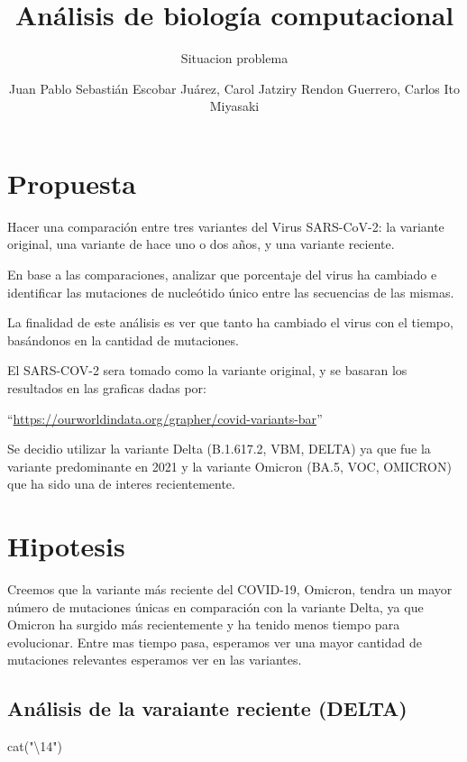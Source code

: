 \documentclass[
]{article}
\title{Análisis de biología computacional}
\subtitle{Situacion problema}
\author{Juan Pablo Sebastián Escobar Juárez, Carol Jatziry Rendon
Guerrero, Carlos Ito Miyasaki}
\date{}
\newenvironment{Shaded}{\begin{snugshade}}{\end{snugshade}}
\newcommand{\FunctionTok}[1]{\textcolor[rgb]{0.00,0.00,0.00}{#1}}
\newcommand{\NormalTok}[1]{#1}
\newcommand{\StringTok}[1]{\textcolor[rgb]{0.31,0.60,0.02}{#1}}
\begin{document}
\maketitle

\hypertarget{propuesta}{%
\section{Propuesta}\label{propuesta}}

Hacer una comparación entre tres variantes del Virus SARS-CoV-2: la
variante original, una variante de hace uno o dos años, y una variante
reciente.

En base a las comparaciones, analizar que porcentaje del virus ha
cambiado e identificar las mutaciones de nucleótido único entre las
secuencias de las mismas.

La finalidad de este análisis es ver que tanto ha cambiado el virus con
el tiempo, basándonos en la cantidad de mutaciones.

El SARS-COV-2 sera tomado como la variante original, y se basaran los
resultados en las graficas dadas por:

``\url{https://ourworldindata.org/grapher/covid-variants-bar}''

Se decidio utilizar la variante Delta (B.1.617.2, VBM, DELTA) ya que fue
la variante predominante en 2021 y la variante Omicron (BA.5, VOC,
OMICRON) que ha sido una de interes recientemente.

\hypertarget{hipotesis}{%
\section{Hipotesis}\label{hipotesis}}

Creemos que la variante más reciente del COVID-19, Omicron, tendra un
mayor número de mutaciones únicas en comparación con la variante Delta,
ya que Omicron ha surgido más recientemente y ha tenido menos tiempo
para evolucionar. Entre mas tiempo pasa, esperamos ver una mayor
cantidad de mutaciones relevantes esperamos ver en las variantes.

\hypertarget{anuxe1lisis-de-la-varaiante-reciente-delta}{%
\subsection{Análisis de la varaiante reciente
(DELTA)}\label{anuxe1lisis-de-la-varaiante-reciente-delta}}

\begin{Shaded}
\begin{Highlighting}[]
\FunctionTok{cat}\NormalTok{(}\StringTok{"\textbackslash{}14"}\NormalTok{)}
\end{Highlighting}
\end{Shaded}
\end{document}
